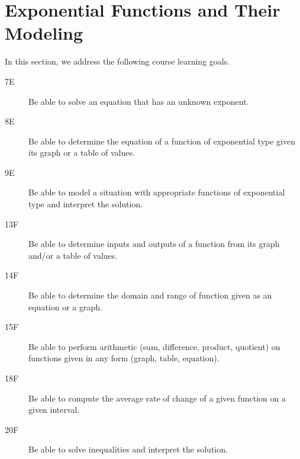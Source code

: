 \documentclass[10pt,]{article}
\theoremstyle{plain}
\theoremstyle{definition}
\numberwithin{equation}{section}
\begin{document}
\section[{Exponential Functions and Their Modeling}]{Exponential Functions and Their Modeling}\label{section-exp}
\hypertarget{p-54}{}%
In this section, we address the following course learning goals.%
\leavevmode%
\begin{description}
\item[{7E}]\hypertarget{li-98}{}\hypertarget{p-55}{}%
Be able to solve an equation that has an unknown exponent.%
\item[{8E}]\hypertarget{li-99}{}\hypertarget{p-56}{}%
Be able to determine the equation of a function of exponential type given its graph or a table of values.%
\item[{9E}]\hypertarget{li-100}{}\hypertarget{p-57}{}%
Be able to model a situation with appropriate functions of exponential type and interpret the solution.%
\item[{13F}]\hypertarget{li-101}{}\hypertarget{p-58}{}%
Be able to determine inputs and outputs of a function from its graph and/or a table of values.%
\item[{14F}]\hypertarget{li-102}{}\hypertarget{p-59}{}%
Be able to determine the domain and range of function given as an equation or a graph.%
\item[{15F}]\hypertarget{li-103}{}\hypertarget{p-60}{}%
Be able to perform arithmetic (sum, difference, product, quotient) on functions given in any form (graph, table, equation).%
\item[{18F}]\hypertarget{li-104}{}\hypertarget{p-61}{}%
Be able to compute the average rate of change of a given function on a given interval.%
\item[{20F}]\hypertarget{li-105}{}\hypertarget{p-62}{}%
Be able to solve inequalities and interpret the solution.%
\end{description}
\end{document}
